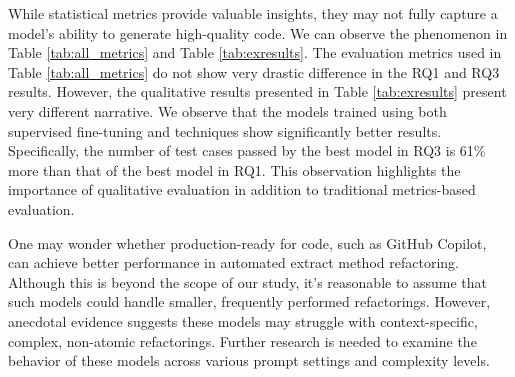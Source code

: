 While statistical metrics provide valuable insights, they may not fully capture a model's ability to generate high-quality code. 
We can observe the phenomenon in Table \ref{tab:all_metrics} and Table \ref{tab:exresults}.
The evaluation metrics used in Table \ref{tab:all_metrics} do not show very drastic difference in the RQ1 and RQ3 results.
However, the qualitative results presented in Table \ref{tab:exresults} present very different narrative.
We observe that the models trained using both supervised fine-tuning and \rl{} techniques show significantly better results. Specifically, the number of test cases passed by the best model in RQ3 is 61\% more than that of the best model in RQ1.
This observation highlights the importance of qualitative evaluation in addition to traditional metrics-based evaluation.


One may wonder whether production-ready \llmsc{} for code, such as GitHub Copilot, can achieve better performance in automated extract method refactoring. Although this is beyond the scope of our study, it's reasonable to assume that such models could handle smaller, frequently performed refactorings. However, anecdotal evidence suggests these models may struggle with context-specific, complex, non-atomic refactorings. Further research is needed to examine the behavior of these models across various prompt settings and complexity levels.